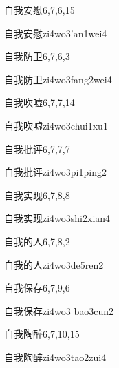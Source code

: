 \begin{entry}{自我安慰}{6,7,6,15}
  \begin{phonetics}{自我安慰}{zi4wo3'an1wei4}
  \end{phonetics}
\end{entry}

\begin{entry}{自我防卫}{6,7,6,3}
  \begin{phonetics}{自我防卫}{zi4wo3fang2wei4}
  \end{phonetics}
\end{entry}

\begin{entry}{自我吹嘘}{6,7,7,14}
  \begin{phonetics}{自我吹嘘}{zi4wo3chui1xu1}
  \end{phonetics}
\end{entry}

\begin{entry}{自我批评}{6,7,7,7}
  \begin{phonetics}{自我批评}{zi4wo3pi1ping2}
  \end{phonetics}
\end{entry}

\begin{entry}{自我实现}{6,7,8,8}
  \begin{phonetics}{自我实现}{zi4wo3shi2xian4}
  \end{phonetics}
\end{entry}

\begin{entry}{自我的人}{6,7,8,2}
  \begin{phonetics}{自我的人}{zi4wo3de5ren2}
  \end{phonetics}
\end{entry}

\begin{entry}{自我保存}{6,7,9,6}
  \begin{phonetics}{自我保存}{zi4wo3 bao3cun2}
  \end{phonetics}
\end{entry}

\begin{entry}{自我陶醉}{6,7,10,15}
  \begin{phonetics}{自我陶醉}{zi4wo3tao2zui4}
  \end{phonetics}
\end{entry}

